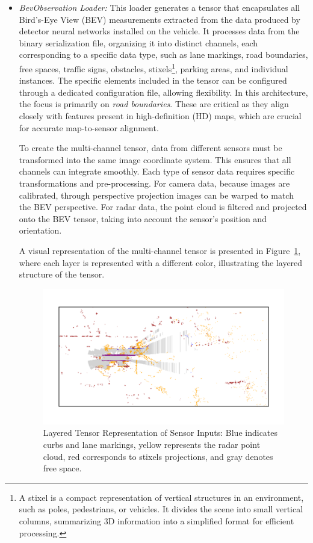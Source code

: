 \begin{itemize}
    \item \textit{BevObservation Loader:} This loader generates a tensor that encapsulates all Bird's-Eye View (BEV) measurements extracted from the data produced by detector neural networks installed on the vehicle. It processes data from the binary serialization file, organizing it into distinct channels, each corresponding to a specific data type, such as lane markings, road boundaries, free spaces, traffic signs, obstacles, stixels\footnote{A stixel is a compact representation of vertical structures in an environment, such as poles, pedestrians, or vehicles. It divides the scene into small vertical columns, summarizing 3D information into a simplified format for efficient processing.}, parking areas, and individual instances. The specific elements included in the tensor can be configured through a dedicated configuration file, allowing flexibility.
    In this architecture, the focus is primarily on \textit{road boundaries}. These are critical as they align closely with features present in high-definition (HD) maps, which are crucial for accurate map-to-sensor alignment.
    
    To create the multi-channel tensor, data from different sensors must be transformed into the same image coordinate system. This ensures that all channels can integrate smoothly. Each type of sensor data requires specific transformations and pre-processing. For camera data, because images are calibrated, through perspective projection images can be warped to match the BEV perspective. For radar data, the point cloud is filtered and projected onto the BEV tensor, taking into account the sensor's position and orientation.

    A visual representation of the multi-channel tensor is presented in Figure~\ref{fig:bev-loader}, where each layer is represented with a different color, illustrating the layered structure of the tensor.

    \begin{minipage}{\linewidth}
    \begin{figure}[H]
        \centering
        \includegraphics[width=0.85\linewidth]{LateX//figs/observations.pdf}
        \caption{Layered Tensor Representation of Sensor Inputs: Blue indicates curbs and lane markings, yellow represents the radar point cloud, red corresponds to stixels projections, and gray denotes free space.}
         \label{fig:bev-loader}
    \end{figure}
    \end{minipage}
    \vspace{0.25 cm}
    

\end{itemize}
